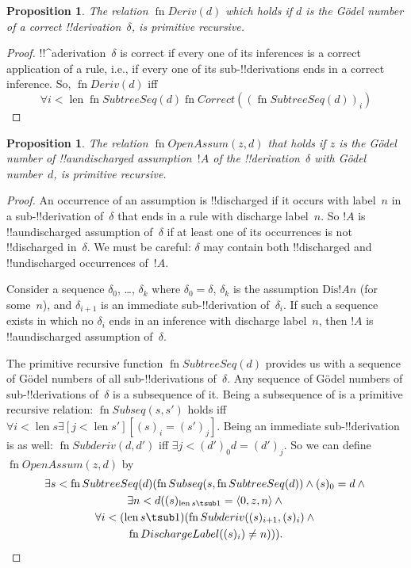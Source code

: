 \documentclass[10pt,a4paper]{article}
\theoremstyle{plain}
\newtheorem{prop}[thm]{Proposition}
\theoremstyle{definition}
\theoremstyle{remark}
\newcommand*{\ollabel}[1]{\label{#1}}
\providecommand{\lexists}{\mathord{\exists}}
\providecommand{\tuple}[1]{\langle #1 \rangle}
\providecommand{\len}{\operatorname{len}}
\providecommand{\bforall}{\forall}
\providecommand{\bexists}{\exists}
\providecommand{\Discharge}{\mathrm{Dis}}
\providecommand{\fn}{\operatorname{fn}}
\begin{document}
\begin{prop}
  \ollabel{prop:deriv}
  The relation $\fn{Deriv}(d)$ which holds if $d$ is the G\"odel
  number of a correct !!{derivation}~$\delta$, is primitive recursive.
\end{prop}

\begin{proof}
  !!^a{derivation}~$\delta$ is correct if every one of its inferences
  is a correct application of a rule, i.e., if every one of its
  sub-!!{derivation}s ends in a correct inference. So, $\fn{Deriv}(d)$
  iff
  \[
  \bforall{i<\len{\fn{SubtreeSeq}(d)}}{\fn{Correct}((\fn{SubtreeSeq}(d))_i)}
  \]
\end{proof}

\begin{prop}
  \ollabel{prop:openassum} The relation $\fn{OpenAssum}(z, d)$ that
  holds if $z$ is the G\"odel number of !!a{undischarged} assumption~$!A$
  of the !!{derivation}~$\delta$ with G\"odel number~$d$, is primitive
  recursive.
\end{prop}

\begin{proof}
  An occurrence of an assumption is !!{discharged} if it occurs with
  label~$n$ in a sub-!!{derivation} of~$\delta$ that ends in a rule
  with discharge label~$n$. So $!A$ is !!a{undischarged} assumption
  of~$\delta$ if at least one of its occurrences is not !!{discharged}
  in~$\delta$. We must be careful: $\delta$ may contain both
  !!{discharged} and !!{undischarged} occurrences of~$!A$.

  Consider a sequence $\delta_0$, \dots, $\delta_k$ where $\delta_0 =
  \delta$, $\delta_k$ is the assumption $\Discharge{!A}{n}$
  (for some~$n$), and $\delta_{i+1}$ is an immediate sub-!!{derivation}
  of~$\delta_i$. If such a sequence exists in which no $\delta_i$
  ends in an inference with discharge label~$n$, then $!A$ is
  !!a{undischarged} assumption of~$\delta$.

  The primitive recursive function $\fn{SubtreeSeq}(d)$ provides us
  with a sequence of G\"odel numbers of all sub-!!{derivation}s
  of~$\delta$. Any sequence of G\"odel numbers of sub-!!{derivation}s
  of~$\delta$ is a subsequence of it. Being a subsequence of is a
  primitive recursive relation: $\fn{Subseq}(s, s')$ holds iff
  $\bforall{i<\len{s}}{\lexists[j<\len{s'}][(s)_i = (s')_j]}$. Being an
  immediate sub-!!{derivation} is as well: $\fn{Subderiv}(d, d')$ iff
  $\bexists{j<(d')_0}{d = (d')_j}$. So we can define
  $\fn{OpenAssum}(z, d)$ by
  \begin{multline*}
    \bexists{s<\fn{SubtreeSeq}(d)}{(\fn{Subseq}(s, \fn{SubtreeSeq}(d))
      \land (s)_0 = d \land {}} \\
    \bexists{n<d}{((s)_{\len{s} \tsub 1} = \tuple{0, z, n} \land {}}\\
      \bforall{i<(\len{s} \tsub 1)}{(\fn{Subderiv}((s)_{i+1}, (s)_i) \land {}}\\
      \fn{DischargeLabel}((s)_i) \neq n))).
  \end{multline*}
\end{proof}
\end{document}
